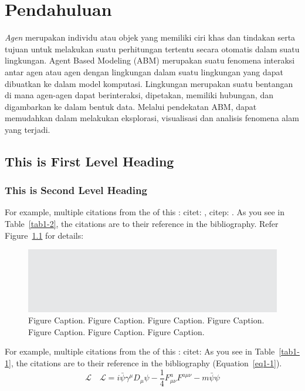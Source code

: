 \chapter{Pendahuluan}

\textit{Agen} merupakan individu atau objek yang memiliki ciri khas dan tindakan serta tujuan untuk melakukan suatu perhitungan tertentu secara otomatis dalam suatu lingkungan. Agent Based Modeling (ABM) merupakan suatu fenomena interaksi antar agen atau agen dengan lingkungan dalam suatu lingkungan yang dapat dibuatkan ke dalam model komputasi. Lingkungan merupakan suatu bentangan di mana agen-agen dapat berinteraksi, dipetakan, memiliki hubungan, dan digambarkan ke dalam bentuk data. Melalui pendekatan ABM, dapat memudahkan dalam melakukan eksplorasi, visualisasi dan analisis fenomena alam yang terjadi.

\section{This is First Level Heading}

\lipsum[1-2]

\subsection{This is Second Level Heading}

\lipsum[3]

For example, multiple citations from the  of this :
citet: \citet{miller2004standing,wilensky2015introduction}, citep: \citep{miller2004standing,wilensky2015introduction}.
As you see in Table~\ref{tab1-2}, the citations are  to their
reference in the bibliography. Refer Figure~\ref{fig1-1} for details:

\begin{figure}
\includegraphics{01.eps}
\caption{Figure Caption. Figure Caption.
Figure Caption. Figure Caption. Figure Caption.
Figure Caption. Figure Caption.
\label{fig1-1}}
\end{figure}

For example, multiple citations from the  of this :
citet: \citet{miller2004standing}
As you see in Table~\ref{tab1-1}, the citations are  to their
reference in the bibliography (Equation~\ref{eq1-1}).
\begin{equation}
\mathcal{L}\quad \mathbf{\mathcal{L}} = i \bar{\psi} \gamma^\mu D_\mu \psi -
\frac{1}{4} F_{\mu\nu}^a F^{a\mu\nu} - m \bar{\psi} \psi\label{eq1-1}
\end{equation}

